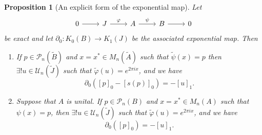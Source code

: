 \documentclass{book}
\newtheorem{proposition}[definition]{Proposition}
\begin{document}
\begin{proposition}[An explicit form of the exponential map]
  Let 
  \[
    \begin{tikzcd}
      0\arrow[r]&J\arrow[r,"\varphi"]&A\arrow[r,"\psi"]&B\arrow[r]&0
    \end{tikzcd}
  \]
  be exact and let \(\partial_0:K_0(B)\rightarrow K_1(J)\) be the associated exponential map. Then
  \begin{enumerate}
    \item If \(p\in\mathcal{P}_n(\tilde{B})\) and \(x=x^*\in M_n(\tilde{A})\) such that \(\tilde{\psi}(x)=p\) then \(\exists! u\in\mathcal{U}_n(\tilde{J})\)
    such that \(\tilde{\varphi}(u)=e^{2\pi i x}\), and we have
    \begin{equation}\label{eq:8312}
      \partial_0({[p]}_0-{[s(p)]}_0)=-{[u]}_1.
    \end{equation}
    \item Suppose that \(A\) is unital. If \(p\in\mathcal{P}_n(B)\) and \(x=x^*\in M_n(A)\) such that \(\psi(x)=p\),
    then \(\exists! u\in\mathcal{U}_n(\tilde{J})\) such that \(\tilde{\varphi}(u)=e^{2\pi i x}\), and we have
    \begin{equation}\label{eq:8313}
      \partial_0({[p]}_0)=-{[u]}_1.
    \end{equation}
  \end{enumerate}
\end{proposition}
\end{document}
